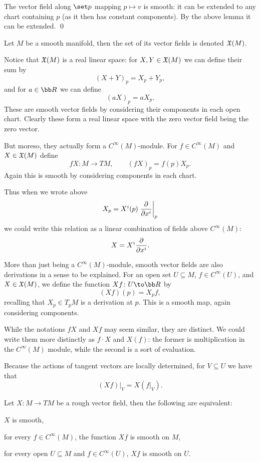 \ecoro

\bproof

    The vector field along $\set p$ mapping $p\mapsto v$ is smooth: it can be extended to any chart containing $p$ (as it then has constant
    components).
    By the above lemma it can be extended.
    \qed

\eproof

\bdefn

    Let $M$ be a smooth manifold, then the set of its vector fields is denoted ${\frak X}(M)$.

\edefn

Notice that ${\frak X}(M)$ is a real linear space: for $X,Y\in{\frak X}(M)$ we can define their sum by
$$ (X+Y)_p = X_p+Y_p , $$
and for $a\in\bR$ we can define
$$ (aX)_p = aX_p . $$
These are smooth vector fields by considering their components in each open chart.
Clearly these form a real linear space with the zero vector field being the zero vector.

But moreso, they actually form a $C^\infty(M)$-module.
For $f\in C^\infty(M)$ and $X\in{\frak X}(M)$ define
$$ fX\colon M\to TM,\qquad (fX)_p = f(p)X_p . $$
Again this is smooth by considering components in each chart.

Thus when we wrote above
$$ X_p = X^i(p)\left.{{\partial }\over{\partial x^i}}\right|_p $$
we could write this relation as a linear combination of fields above $C^\infty(M)$:
$$ X = X^i{{\partial }\over{\partial x^i}} . $$

More than just being a $C^\infty(M)$-module, smooth vector fields are also derivations in a sense to be explained.
For an open set $U\subseteq M$, $f\in C^\infty(U)$, and $X\in{\frak X}(M)$, we define the function $Xf\colon U\to\bR$ by
$$ (Xf)(p) = X_pf , $$
recalling that $X_p\in T_pM$ is a derivation at $p$.
This is a smooth map, again considering components.

\bnote

    While the notations $fX$ and $Xf$ may seem similar, they are distinct.
    We could write them more distinctly as $f\cdot X$ and $X(f)$: the former is multiplication in the $C^\infty(M)$ module, while the second
    is a sort of evaluation.

\enote

Because the actions of tangent vectors are locally determined, for $V\subseteq U$ we have that
$$ (Xf)|_V = X(f|_V) . $$

\bprop

    Let $X\colon M\to TM$ be a rough vector field, then the following are equivalent:
    \benum
        \item $X$ is smooth,
        \item for every $f\in C^\infty(M)$, the function $Xf$ is smooth on $M$,
        \item for every open $U\subseteq M$ and $f\in C^\infty(U)$, $Xf$ is smooth on $U$.
    \eenum

